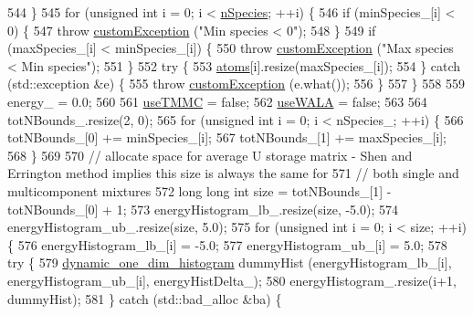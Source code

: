 \begin{DoxyCode}
544     \}
545     \textcolor{keywordflow}{for} (\textcolor{keywordtype}{unsigned} \textcolor{keywordtype}{int} i = 0; i < \hyperlink{classsim_system_ab5e2e9b6204de15520302fe1d51688dd}{nSpecies}; ++i) \{
546         \textcolor{keywordflow}{if} (minSpecies\_[i] < 0) \{
547             \textcolor{keywordflow}{throw} \hyperlink{classcustom_exception}{customException} (\textcolor{stringliteral}{"Min species < 0"});
548         \}
549         \textcolor{keywordflow}{if} (maxSpecies\_[i] < minSpecies\_[i]) \{
550             \textcolor{keywordflow}{throw} \hyperlink{classcustom_exception}{customException} (\textcolor{stringliteral}{"Max species < Min species"});
551         \}
552         \textcolor{keywordflow}{try} \{
553             \hyperlink{classsim_system_a90421b19082f7fb8fc23b7264b1161e4}{atoms}[i].resize(maxSpecies\_[i]);
554         \} \textcolor{keywordflow}{catch} (std::exception &e) \{
555             \textcolor{keywordflow}{throw} \hyperlink{classcustom_exception}{customException} (e.what());
556         \}
557     \}
558 
559     energy\_ = 0.0;
560 
561     \hyperlink{classsim_system_aa474a50b6353c8897331b1ab1ce53ab1}{useTMMC} = \textcolor{keyword}{false};
562     \hyperlink{classsim_system_aa83b00006b3919fb6e13f1bdeadece6a}{useWALA} = \textcolor{keyword}{false};
563 
564     totNBounds\_.resize(2, 0);
565     \textcolor{keywordflow}{for} (\textcolor{keywordtype}{unsigned} \textcolor{keywordtype}{int} i = 0; i < nSpecies\_; ++i) \{
566         totNBounds\_[0] += minSpecies\_[i];
567         totNBounds\_[1] += maxSpecies\_[i];
568     \}
569 
570     \textcolor{comment}{// allocate space for average U storage matrix - Shen and Errington method implies this size is always
       the same for}
571     \textcolor{comment}{// both single and multicomponent mixtures}
572     \textcolor{keywordtype}{long} \textcolor{keywordtype}{long} \textcolor{keywordtype}{int} size = totNBounds\_[1] - totNBounds\_[0] + 1;
573     energyHistogram\_lb\_.resize(size, -5.0);
574     energyHistogram\_ub\_.resize(size, 5.0);
575     \textcolor{keywordflow}{for} (\textcolor{keywordtype}{unsigned} \textcolor{keywordtype}{int} i = 0; i < size; ++i) \{
576         energyHistogram\_lb\_[i] = -5.0;
577         energyHistogram\_ub\_[i] = 5.0;
578         \textcolor{keywordflow}{try} \{
579             \hyperlink{classdynamic__one__dim__histogram}{dynamic\_one\_dim\_histogram} dummyHist (energyHistogram\_lb\_[i], 
      energyHistogram\_ub\_[i], energyHistDelta\_);
580             energyHistogram\_.resize(i+1, dummyHist);
581         \} \textcolor{keywordflow}{catch} (std::bad\_alloc &ba) \{

\end{DoxyCode}
